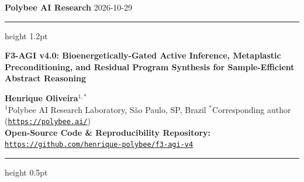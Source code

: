 \documentclass[10pt,a4paper]{article}
\begin{document}
\thispagestyle{fancy}
\noindent
{\large\textbf{\textcolor{primary}{Polybee AI Research}}} \hfill {\small\textcolor{slate}{2026-10-29}}
\vspace{2pt}
\hrule height 1.2pt
\vspace{12pt}

{\LARGE\textbf{F3-AGI v4.0: Bioenergetically-Gated Active Inference, Metaplastic Preconditioning, and Residual Program Synthesis for Sample-Efficient Abstract Reasoning}}

\vspace{10pt}
\noindent
{\normalsize \textbf{Henrique Oliveira}$^{1,*}$} \\[4pt]
{\small $^1$Polybee AI Research Laboratory, S\~ao Paulo, SP, Brazil \quad $^*$Corresponding author (\texttt{\href{https://polybee.ai/}{https://polybee.ai/}})} \\[2pt]
{\small \textbf{Open-Source Code \& Reproducibility Repository:} \texttt{\href{https://github.com/henrique-polybee/f3-agi-v4}{https://github.com/henrique-polybee/f3-agi-v4}}}

\vspace{8pt}
\hrule height 0.5pt
\vspace{6pt}
\end{document}
